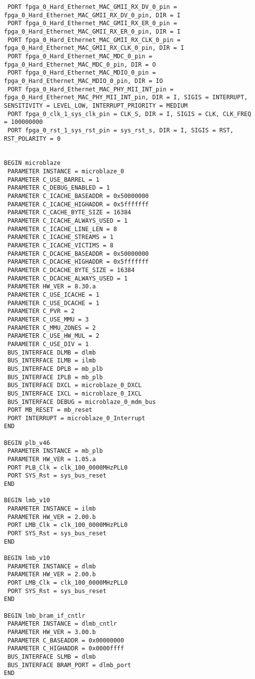 \begin{verbatim}
 PORT fpga_0_Hard_Ethernet_MAC_GMII_RX_DV_0_pin = fpga_0_Hard_Ethernet_MAC_GMII_RX_DV_0_pin, DIR = I
 PORT fpga_0_Hard_Ethernet_MAC_GMII_RX_ER_0_pin = fpga_0_Hard_Ethernet_MAC_GMII_RX_ER_0_pin, DIR = I
 PORT fpga_0_Hard_Ethernet_MAC_GMII_RX_CLK_0_pin = fpga_0_Hard_Ethernet_MAC_GMII_RX_CLK_0_pin, DIR = I
 PORT fpga_0_Hard_Ethernet_MAC_MDC_0_pin = fpga_0_Hard_Ethernet_MAC_MDC_0_pin, DIR = O
 PORT fpga_0_Hard_Ethernet_MAC_MDIO_0_pin = fpga_0_Hard_Ethernet_MAC_MDIO_0_pin, DIR = IO
 PORT fpga_0_Hard_Ethernet_MAC_PHY_MII_INT_pin = fpga_0_Hard_Ethernet_MAC_PHY_MII_INT_pin, DIR = I, SIGIS = INTERRUPT, SENSITIVITY = LEVEL_LOW, INTERRUPT_PRIORITY = MEDIUM
 PORT fpga_0_clk_1_sys_clk_pin = CLK_S, DIR = I, SIGIS = CLK, CLK_FREQ = 100000000
 PORT fpga_0_rst_1_sys_rst_pin = sys_rst_s, DIR = I, SIGIS = RST, RST_POLARITY = 0


BEGIN microblaze
 PARAMETER INSTANCE = microblaze_0
 PARAMETER C_USE_BARREL = 1
 PARAMETER C_DEBUG_ENABLED = 1
 PARAMETER C_ICACHE_BASEADDR = 0x50000000
 PARAMETER C_ICACHE_HIGHADDR = 0x5fffffff
 PARAMETER C_CACHE_BYTE_SIZE = 16384
 PARAMETER C_ICACHE_ALWAYS_USED = 1
 PARAMETER C_ICACHE_LINE_LEN = 8
 PARAMETER C_ICACHE_STREAMS = 1
 PARAMETER C_ICACHE_VICTIMS = 8
 PARAMETER C_DCACHE_BASEADDR = 0x50000000
 PARAMETER C_DCACHE_HIGHADDR = 0x5fffffff
 PARAMETER C_DCACHE_BYTE_SIZE = 16384
 PARAMETER C_DCACHE_ALWAYS_USED = 1
 PARAMETER HW_VER = 8.30.a
 PARAMETER C_USE_ICACHE = 1
 PARAMETER C_USE_DCACHE = 1
 PARAMETER C_PVR = 2
 PARAMETER C_USE_MMU = 3
 PARAMETER C_MMU_ZONES = 2
 PARAMETER C_USE_HW_MUL = 2
 PARAMETER C_USE_DIV = 1
 BUS_INTERFACE DLMB = dlmb
 BUS_INTERFACE ILMB = ilmb
 BUS_INTERFACE DPLB = mb_plb
 BUS_INTERFACE IPLB = mb_plb
 BUS_INTERFACE DXCL = microblaze_0_DXCL
 BUS_INTERFACE IXCL = microblaze_0_IXCL
 BUS_INTERFACE DEBUG = microblaze_0_mdm_bus
 PORT MB_RESET = mb_reset
 PORT INTERRUPT = microblaze_0_Interrupt
END

BEGIN plb_v46
 PARAMETER INSTANCE = mb_plb
 PARAMETER HW_VER = 1.05.a
 PORT PLB_Clk = clk_100_0000MHzPLL0
 PORT SYS_Rst = sys_bus_reset
END

BEGIN lmb_v10
 PARAMETER INSTANCE = ilmb
 PARAMETER HW_VER = 2.00.b
 PORT LMB_Clk = clk_100_0000MHzPLL0
 PORT SYS_Rst = sys_bus_reset
END

BEGIN lmb_v10
 PARAMETER INSTANCE = dlmb
 PARAMETER HW_VER = 2.00.b
 PORT LMB_Clk = clk_100_0000MHzPLL0
 PORT SYS_Rst = sys_bus_reset
END

BEGIN lmb_bram_if_cntlr
 PARAMETER INSTANCE = dlmb_cntlr
 PARAMETER HW_VER = 3.00.b
 PARAMETER C_BASEADDR = 0x00000000
 PARAMETER C_HIGHADDR = 0x0000ffff
 BUS_INTERFACE SLMB = dlmb
 BUS_INTERFACE BRAM_PORT = dlmb_port
END


\end{verbatim}
